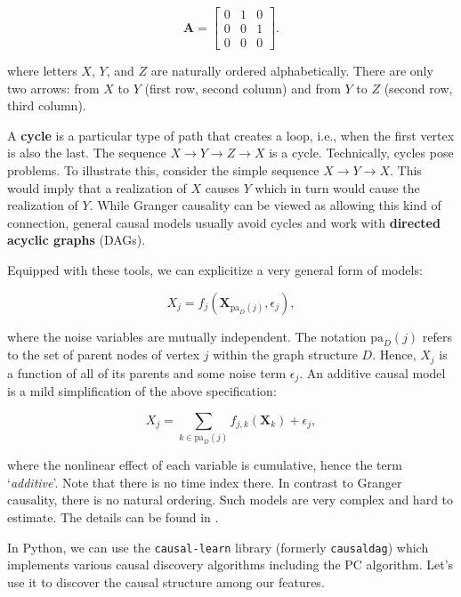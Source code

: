 \begin{equation}
\textbf{A}=\begin{bmatrix}
0 & 1 & 0 \\
0 & 0 & 1 \\
0& 0&0
\end{bmatrix}.
\end{equation}

where letters $X$, $Y$, and $Z$ are naturally ordered alphabetically. There are only two arrows: from $X$ to $Y$ (first row, second column) and from $Y$ to $Z$ (second row, third column).

A \textbf{cycle} is a particular type of path that creates a loop, i.e., when the first vertex is also the last. The sequence $X \rightarrow Y \rightarrow Z \rightarrow X$ is a cycle. Technically, cycles pose problems. To illustrate this, consider the simple sequence $X \rightarrow Y \rightarrow X$. This would imply that a realization of $X$ causes $Y$ which in turn would cause the realization of $Y$. While Granger causality can be viewed as allowing this kind of connection, general causal models usually avoid cycles and work with \textbf{directed acyclic graphs} (DAGs).

Equipped with these tools, we can explicitize a very general form of models:

\begin{equation}
\label{eq:CAM0}
X_j=f_j\left(\textbf{X}_{\text{pa}_D(j)},\epsilon_j  \right),
\end{equation}

where the noise variables are mutually independent. The notation $\text{pa}_D(j)$ refers to the set of parent nodes of vertex $j$ within the graph structure $D$. Hence, $X_j$ is a function of all of its parents and some noise term $\epsilon_j$. An additive causal model is a mild simplification of the above specification:

\begin{equation}
\label{eq:CAM}
X_j=\sum_{k\in \text{pa}_D(j)}f_{j,k}\left(\textbf{X}_{k}  \right)+\epsilon_j,
\end{equation}

where the nonlinear effect of each variable is cumulative, hence the term `\textit{additive}'. Note that there is no time index there. In contrast to Granger causality, there is no natural ordering. Such models are very complex and hard to estimate. The details can be found in \cite{buhlmann2014cam}.

In Python, we can use the \texttt{causal-learn} library (formerly \texttt{causaldag}) which implements various causal discovery algorithms including the PC algorithm. Let's use it to discover the causal structure among our features.


